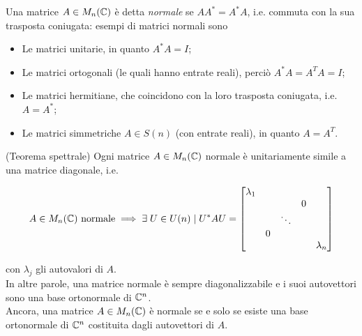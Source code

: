 Una matrice $ A \in M_{n}(\mathbb{C}) $ è detta \textit{normale} se $ A A^{*} = A^{*} A $, i.e. commuta con la sua trasposta coniugata: esempi di matrici normali sono

\begin{itemize}
	\item Le matrici unitarie, in quanto $ A^{*} A = I $;
	
	\item Le matrici ortogonali (le quali hanno entrate reali), perciò $ A^{*} A = A^{T} A = I $;
	
	\item Le matrici hermitiane, che coincidono con la loro trasposta coniugata, i.e. $ A = A^{*} $;
	
	\item Le matrici simmetriche $ A \in S(n) $ (con entrate reali), in quanto $ A = A^{T} $.
\end{itemize}

\begin{theorem}(Teorema spettrale)
	Ogni matrice $ A \in M_{n}(\mathbb{C}) $ normale è unitariamente simile a una matrice diagonale, i.e.
	
	\begin{equation}
		A \in M_{n}(\C) \text{ normale} %
		\implies %
		\E U \in U(n) \mid U^{*} A U = %
		\bmqty{ %
				\dmat{ %
						\lambda_{1},
						& & 0 \\ & \ddots & \\ 0 & & ,
						\lambda_{n}
						}
				}
	\end{equation}

	con $ \lambda_{j} $ gli autovalori di $ A $.\\
	In altre parole, una matrice normale è sempre diagonalizzabile e i suoi autovettori sono una base ortonormale di $ \mathbb{C}^{n} $.\\
	Ancora, una matrice $ A \in M_{n}(\mathbb{C}) $ è normale se e solo se esiste una base ortonormale di $ \mathbb{C}^{n} $ costituita dagli autovettori di $ A $.
\end{theorem}

